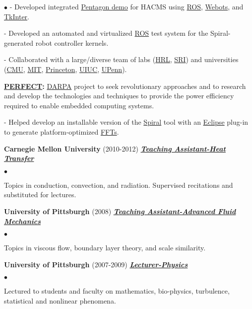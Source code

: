 \documentclass{article}
\newcommand{\employer}[3]{{ \textbf{#1} (#2) \underline{\textbf{\emph{#3}}}\\  }}
\newenvironment{achievements}{\begin{list}{$\bullet$}{\topsep 0pt \itemsep -2pt}}{\vspace*{4pt}\end{list}}
\begin{document}
\begin{achievements}
- Developed integrated \href{http://www.darpa.mil/NewsEvents/Releases/2014/05/21.aspx}{Pentagon demo} for HACMS using \href{http://www.ros.org/}{ROS}, \href{http://www.cyberbotics.com/}{Webots}, and \href{https://wiki.python.org/moin/TkInter}{TkInter}. 

- Developed an automated and virtualized \href{http://www.ros.org/}{ROS} test system for the Spiral-generated robot controller kernels.  

- Collaborated with a large/diverse team of labs (\href{http://www.hrl.com/}{HRL}, \href{http://www.sri.com/}{SRI}) and universities (\href{http://www.cmu.edu/}{CMU}, \href{http://web.mit.edu/}{MIT}, \href{http://www.princeton.edu/}{Princeton}, \href{http://illinois.edu/}{UIUC}, \href{http://www.upenn.edu/}{UPenn}). 

\item \textbf{\href{http://www.darpa.mil/Our_Work/MTO/Programs/Power_Efficiency_Revolution_for_Embedded_Computing_Technologies_(PERFECT).aspx}{PERFECT}:}
\href{http://www.darpa.mil/default.aspx}{DARPA} project to seek revolutionary approaches and to research and develop the technologies and techniques to provide the power efficiency required to enable embedded computing systems. 

- Helped develop an installable version of the \href{http://spiral.net/}{Spiral} tool with an \href{http://www.eclipse.org/}{Eclipse} plug-in to generate platform-optimized \href{http://en.wikipedia.org/wiki/Fast_Fourier_transform}{FFTs}. 
\end{achievements}

\employer{Carnegie Mellon University}{2010-2012}{Teaching Assistant-Heat Transfer}
	\begin{achievements}
	\item Topics in conduction, convection, and radiation. Supervised recitations and substituted for lectures. 
	\end{achievements}

\employer{University of Pittsburgh}{2008}{Teaching Assistant-Advanced Fluid Mechanics}
	\begin{achievements}
	\item Topics in viscous flow, boundary layer theory, and scale similarity. 
	\end{achievements}

\employer{University of Pittsburgh}{2007-2009}{Lecturer-Physics}
	\begin{achievements}
	\item Lectured to students and faculty on mathematics, bio-physics, turbulence, statistical and nonlinear phenomena. 
	\end{achievements}
\end{document}
